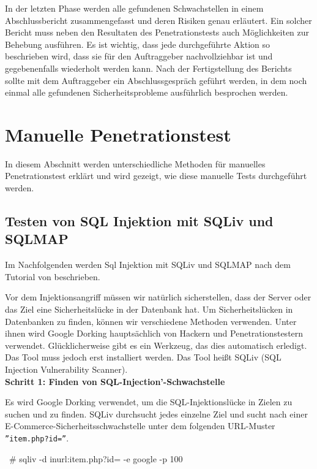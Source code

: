 In der letzten Phase werden alle gefundenen Schwachstellen in einem Abschlussbericht zusammengefasst
und deren Risiken genau erläutert. Ein solcher Bericht muss neben den Resultaten des Penetrationstests auch
Möglichkeiten zur Behebung ausführen. Es ist wichtig, dass jede durchgeführte Aktion so beschrieben wird,
dass sie für den Auftraggeber nachvollziehbar ist und gegebenenfalls wiederholt werden kann. Nach der
Fertigstellung des Berichts sollte mit dem Auftraggeber ein Abschlussgespräch geführt werden, in dem noch
einmal alle gefundenen Sicherheitsprobleme ausführlich besprochen werden.

\section{Manuelle Penetrationstest}

In diesem Abschnitt werden unterschiedliche Methoden für manuelles Penetrationstest erklärt und wird gezeigt, wie diese manuelle Tests durchgeführt werden. 

\subsection{Testen von SQL Injektion mit SQLiv und SQLMAP}

Im Nachfolgenden werden Sql Injektion mit SQLiv und SQLMAP nach dem Tutorial von \cite{ramadhan17sqlinj} beschrieben.

Vor dem Injektionsangriff müssen wir natürlich sicherstellen, dass der Server oder das Ziel eine Sicherheitslücke in der Datenbank hat. Um Sicherheitslücken in Datenbanken zu finden, können wir verschiedene Methoden verwenden. Unter ihnen wird Google Dorking hauptsächlich von Hackern und Penetrationstestern verwendet. Glücklicherweise gibt es ein Werkzeug, das dies automatisch erledigt. Das Tool muss jedoch erst installiert werden. Das Tool heißt SQLiv (SQL Injection Vulnerability Scanner).\\

\textbf{Schritt 1: Finden von SQL-Injection'-Schwachstelle}

Es wird Google Dorking verwendet, um die SQL-Injektionslücke in Zielen zu suchen und zu finden. SQLiv durchsucht jedes einzelne Ziel und sucht nach einer E-Commerce-Sicherheitsschwachstelle unter dem folgenden URL-Muster \texttt{''item.php?id=''}.\\

\begin{LaTeXCode}[caption={Google Dorking mit SQLiv},captionpos=b, label=LaTeXCode:gdsqliv][numbers=none]
~# sqliv -d inurl:item.php?id= -e google -p 100
\end{LaTeXCode}

